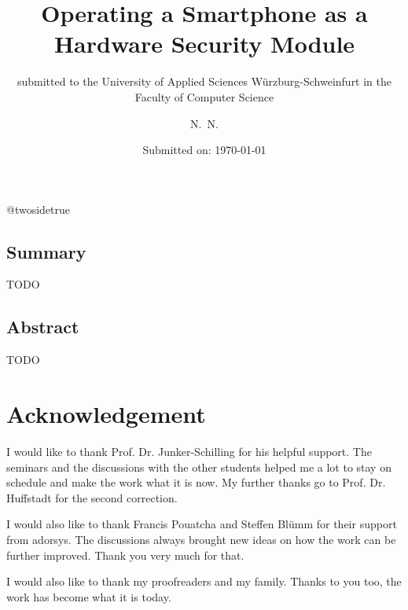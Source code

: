 \documentclass[12pt,oneside,a4paper,parskip]{scrbook}
\makeatletter
\def\BaAuthor{Achim Winter}
\def\BaAuthorStudyProgram{Computer Science}
\def\BaType{Bachelor thesis} %
\def\BaTitle{Operating a Smartphone as a Hardware Security Module}
\def\BaSupervisorOne{Prof.\ Dr.\ Junker-Schilling}
\def\BaSupervisorTwo{Prof.\ Dr.\ Huffstadt}
\def\BaDeadline{\today}
\def\ShowBaAuthor{\BaAuthor}
\def\ShowBaAuthor{N.~N.}
\newcommand*{\forcetwosidetitle}[1][1]{%
 \begingroup
   \cleardoubleoddpage
   \KOMAoptions{titlepage=true}%
   \csname @twosidetrue\endcsname
   \maketitle[{#1}]
 \endgroup
}
\makeatother
\begin{document}


\frontmatter
\titlehead{%
  {University of applied Sciences W\"{u}rzburg-Schweinfurt\\
   Faculty of Computer Science und Business Informatics}}
\subject{\BaType}
\title{\BaTitle\\[15mm]}
\subtitle{\normalsize{submitted to the University of Applied Sciences W\"{u}rzburg-Schweinfurt in the Faculty of \BaAuthorStudyProgram}}
\author{\ShowBaAuthor}
\date{\normalsize{Submitted on: \BaDeadline}}
\publishers{
  \normalsize{First Supervisor: \BaSupervisorOne}\\
  \normalsize{Second Supervisor: \BaSupervisorTwo}\\
}

\forcetwosidetitle



\section*{Summary}
TODO

\section*{Abstract}

TODO

\newpage
\chapter*{Acknowledgement}

I would like to thank Prof. Dr. Junker-Schilling for his helpful support. The seminars and the discussions with the other students helped me a lot to stay on schedule and make the work what it is now. My further thanks go to Prof. Dr. Huffstadt for the second correction. 

I would also like to thank Francis Pouatcha and Steffen Blümm for their support from adorsys. The discussions always brought new ideas on how the work can be further improved. Thank you very much for that.

I would also like to thank my proofreaders and my family. Thanks to you too, the work has become what it is today.

\tableofcontents
\end{document}
